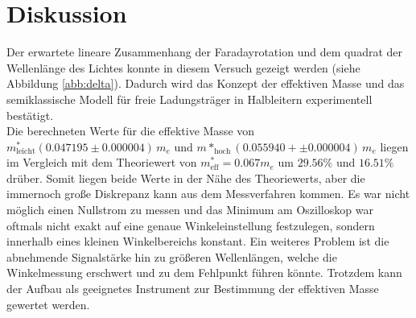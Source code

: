 \section{Diskussion}
\label{sec:Diskussion}
Der erwartete lineare Zusammenhang der Faradayrotation und dem quadrat der Wellenlänge des Lichtes konnte in diesem Versuch gezeigt werden (siehe Abbildung \ref{abb:delta}).
Dadurch wird das Konzept der effektiven Masse und das semiklassische Modell für freie Ladungsträger in Halbleitern experimentell bestätigt.
\\
Die berechneten Werte für die effektive Masse von $m^*_{\text{leicht}}(0.047195\pm 0.000004)\,m_e$ und $m*_{\text{hoch}}(0.055940+\pm 0.000004)\,m_e$ 
liegen im Vergleich mit dem Theoriewert von $m^*_{\text{eff}}=0.067m_e$ \cite{meff} um $29.56\%$ und $16.51\%$ drüber.
Somit liegen beide Werte in der Nähe des Theoriewerts, aber die immernoch große Diskrepanz kann aus dem Messverfahren kommen.
Es war nicht möglich einen Nullstrom zu messen und das Minimum am Oszilloskop war oftmals nicht exakt auf eine genaue Winkeleinstellung festzulegen, sondern innerhalb eines kleinen Winkelbereichs konstant.
Ein weiteres Problem ist die abnehmende Signalstärke hin zu größeren Wellenlängen, welche die Winkelmessung erschwert und zu dem Fehlpunkt führen könnte.
Trotzdem kann der Aufbau als geeignetes Instrument zur Bestimmung der effektiven Masse gewertet werden.
